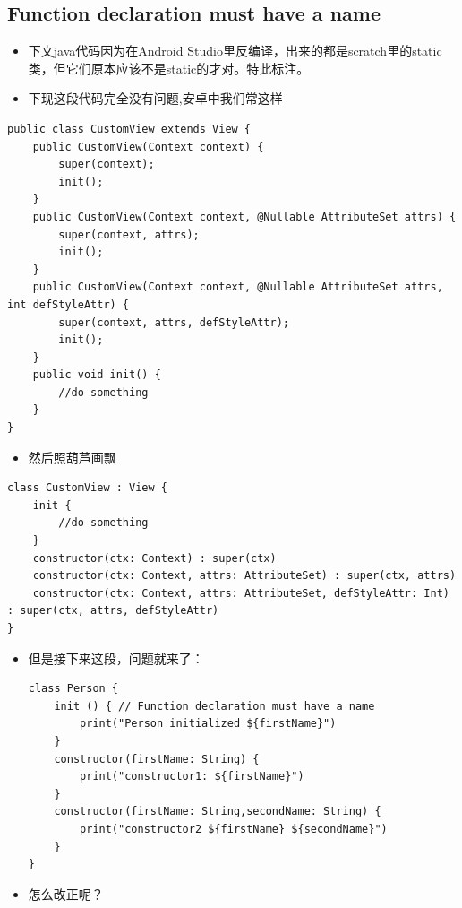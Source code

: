 \documentclass[9pt, b5paper]{article}
\begin{document}
\subsection{Function declaration must have a name}
\label{sec-7-1}
\begin{itemize}
\item 下文java代码因为在Android Studio里反编译，出来的都是scratch里的static类，但它们原本应该不是static的才对。特此标注。
\item 下现这段代码完全没有问题,安卓中我们常这样
\end{itemize}
\begin{verbatim}
public class CustomView extends View {
    public CustomView(Context context) {
        super(context);
        init();
    }
    public CustomView(Context context, @Nullable AttributeSet attrs) {
        super(context, attrs);
        init();
    }
    public CustomView(Context context, @Nullable AttributeSet attrs, int defStyleAttr) {
        super(context, attrs, defStyleAttr);
        init();
    }
    public void init() {
        //do something
    }
}
\end{verbatim}
\begin{itemize}
\item 然后照葫芦画飘
\end{itemize}
\begin{verbatim}
class CustomView : View {
    init {
        //do something
    }
    constructor(ctx: Context) : super(ctx)
    constructor(ctx: Context, attrs: AttributeSet) : super(ctx, attrs)
    constructor(ctx: Context, attrs: AttributeSet, defStyleAttr: Int) : super(ctx, attrs, defStyleAttr)
}
\end{verbatim}
\begin{itemize}
\item 但是接下来这段，问题就来了：
\begin{verbatim}
class Person {
    init () { // Function declaration must have a name
        print("Person initialized ${firstName}")
    }
    constructor(firstName: String) {
        print("constructor1: ${firstName}")    
    }
    constructor(firstName: String,secondName: String) {
        print("constructor2 ${firstName} ${secondName}")
    }
}
\end{verbatim}
\item 怎么改正呢？
\end{itemize}
\end{document}
